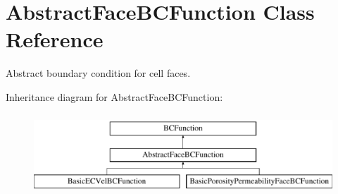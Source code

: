 \hypertarget{class_abstract_face_b_c_function}{}\section{Abstract\+Face\+B\+C\+Function Class Reference}
\label{class_abstract_face_b_c_function}


Abstract boundary condition for cell faces.  


Inheritance diagram for Abstract\+Face\+B\+C\+Function\+:\begin{figure}[H]
\begin{center}
\leavevmode
\includegraphics[height=3.000000cm]{class_abstract_face_b_c_function}
\end{center}
\end{figure}
